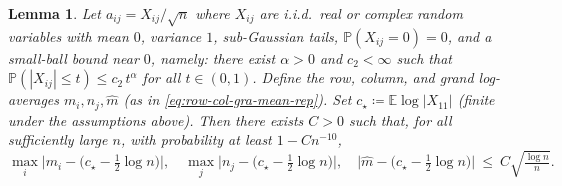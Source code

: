 \documentclass[11pt,a4paper]{article}
\newtheorem{lemma}[theorem]{Lemma}
\newcommand{\Prob}{\mathbb{P}}
\newcommand{\E}{\mathbb{E}}
\begin{document}
\begin{lemma}\label{lem:log-mean-conc}
Let $a_{ij}=X_{ij}/\sqrt n$ where $X_{ij}$ are i.i.d.\ real or complex random variables with \emph{mean} $0$, \emph{variance} $1$, \emph{sub-Gaussian} tails, $\Prob(X_{ij}=0)=0$, and a small-ball bound near $0$, namely: there exist $\alpha>0$ and $c_2<\infty$ such that $\Prob(|X_{ij}|\le t)\le c_2\,t^{\alpha}$ for all $t\in(0,1)$. Define the row, column, and grand log-averages $m_i,n_j,\hat{m}$ (as in \cref{eq:row-col-gra-mean-rep}). Set $c_\star\coloneq \E\log|X_{11}|$ (finite under the assumptions above). Then there exists $C>0$ such that, for all sufficiently large $n$, with probability at least $1-Cn^{-10}$,
\begin{equation}
\max_i\Big|m_i-\big(c_\star-\tfrac12\log n\big)\Big|,\quad
\max_j\Big|n_j-\big(c_\star-\tfrac12\log n\big)\Big|,\quad
\Big|\hat{m}-\big(c_\star-\tfrac12\log n\big)\Big|
\ \le\ C\sqrt{\tfrac{\log n}{n}}.
\end{equation}
\end{lemma}
\end{document}
